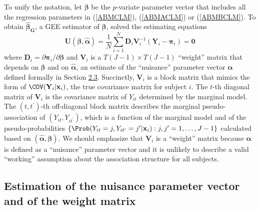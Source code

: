 \documentclass[
]{jss}
\begin{document}
To unify the notation, let \(\boldsymbol \beta\) be the \(p\)-variate
parameter vector that includes all the regression parameters in
(\ref{ABMCLM}), (\ref{ABMACLM}) or (\ref{ABMBCLM}). To obtain
\(\boldsymbol {\widehat \beta_G}\), a GEE estimator of
\(\boldsymbol \beta\), \citet{Touloumis2012} solved the estimating
equations \begin{equation}
\mathbf{U}(\boldsymbol \beta,\widehat{\boldsymbol \alpha})=\frac{1}{N}\sum_{i=1}^N \mathbf{D}_i \mathbf V^{-1}_{i} (\mathbf {Y}_i-\boldsymbol{\pi}_i)=\mathbf{0}
\label{EEbeta}
\end{equation} where
\(\mathbf{D}_i=\partial \boldsymbol{\pi}_i/\partial \boldsymbol{\beta}\)
and \(\mathbf V_i\) is a \(T(J-1) \times T(J-1)\) ``weight'' matrix that
depends on \(\boldsymbol \beta\) and on
\(\widehat{\boldsymbol \alpha}\), an estimate of the ``nuisance''
parameter vector \(\boldsymbol \alpha\) defined formally in Section
\protect\hyperlink{Alpha}{2.3}. Succinctly, \(\mathbf V_i\) is a block
matrix that mimics the form of \(\COV(\mathbf{Y}_i|\mathbf x_i)\), the
true covariance matrix for subject \(i\). The \(t\)-th diagonal matrix
of \(\mathbf V_i\) is the covariance matrix of \(Y_{it}\) determined by
the marginal model. The \((t,t^{\prime})\)-th off-diagonal block matrix
describes the marginal pseudo-association of
\((Y_{it},Y_{it^{\prime}})\), which is a function of the marginal model
and of the pseudo-probabilities
\(\{\Prob(Y_{it}=j,Y_{it^{\prime}}=j^{\prime}|\mathbf x_i):j,j^{\prime}=1,\ldots,J-1\}\)
calculated based on
\((\widehat{\boldsymbol \alpha},\boldsymbol \beta)\). We should
emphasize that \(\mathbf V_i\) is a ``weight'' matrix because
\(\boldsymbol \alpha\) is defined as a ``nuisance'' parameter vector and
it is unlikely to describe a valid ``working'' assumption about the
association structure for all subjects.

\hypertarget{Alpha}{%
\subsection{Estimation of the nuisance parameter vector and of the
weight matrix}\label{Alpha}}
\end{document}
